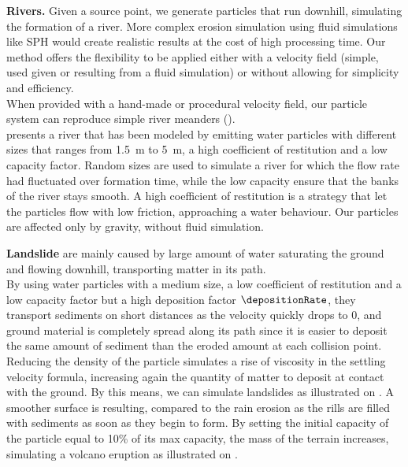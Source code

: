 \textbf{Rivers.}
Given a source point, we generate particles that run downhill, simulating the formation of a river. More complex erosion simulation using fluid simulations like SPH \cite{Kristof2009} would create realistic results at the cost of high processing time. Our method offers the flexibility to be applied either with a velocity field (simple, used given or resulting from a fluid simulation) or without allowing for simplicity and efficiency.\\
When provided with a hand-made or procedural velocity field, our particle system can reproduce simple river meanders (). \\ 
 presents a river that has been modeled by emitting water particles with different sizes that ranges from \SI{1.5}{\meter} to \SI{5}{\meter}, a high coefficient of restitution and a low capacity factor. Random sizes are used to simulate a river for which the flow rate had fluctuated over formation time, while the low capacity ensure that the banks of the river stays smooth. A high coefficient of restitution is a strategy that let the particles flow with low friction, approaching a water behaviour. Our particles are affected only by gravity, without fluid simulation.

\textbf{Landslide}
are mainly caused by large amount of water saturating the ground and flowing downhill, transporting matter in its path. \\
By using water particles with a medium size, a low coefficient of restitution and a low capacity factor but a high deposition factor $\depositionRate$, they transport sediments on short distances as the velocity quickly drops to 0, and ground material is completely spread along its path since it is easier to deposit the same amount of sediment than the eroded amount at each collision point. Reducing the density of the particle simulates a rise of viscosity in the settling velocity formula, increasing again the quantity of matter to deposit at contact with the ground. By this means, we can simulate landslides as illustrated on . A smoother surface is resulting, compared to the rain erosion as the rills are filled with sediments as soon as they begin to form.
%
By setting the initial capacity of the particle equal to 10\% of its max capacity, the mass of the terrain increases, simulating a volcano eruption as illustrated on .

